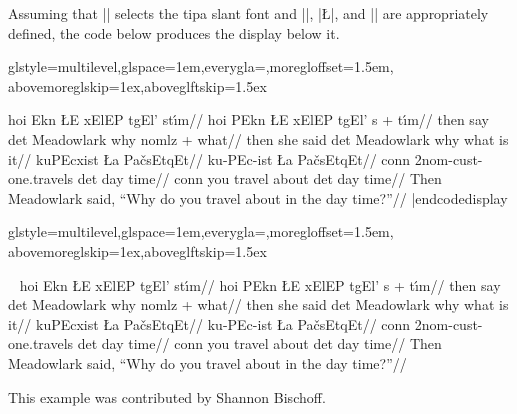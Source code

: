 Assuming that |\ips| selects the tipa slant font and |\mroot|, |\L|,
and |\W| are appropriately defined, the code below produces the
display below it.

\codedisplay
{}%
   {glstyle=multilevel,glspace=1em,everygla=\ips,moregloffset=1.5em,
   abovemoreglskip=1ex,aboveglftskip=1.5ex}

\ex[lingstyle=ips-gloss]
\begingl
\gla hoi Ekn {\L}E {x\W}ElEP t{g\W}El' st{\'\i}m//
\gla hoi {\mroot}PEkn {\L}E {x\W}ElEP t{g\W}El' {s + \mroot t\'\i m}//
\glb then {\mroot}say det Meadowlark why
   {nomlz + \mroot what}//
\glb then {she said} det Meadowlark why {what is it}//
\moregl
{} {kuPEcx\W ist} {\L a} Pa{\v c}sEtqEt//
 ku-PEc-ist {\L}a Pa{\v c}sEtqEt//
\glb conn 2nom-cust-{\mroot}one.travels det {day time}//
\glb conn {you travel about} det {day time}//
\glft Then Meadowlark said, ``Why do you travel about in the day
time?''//
\endgl
\xe
|endcodedisplay

%
   {glstyle=multilevel,glspace=1em,everygla=\ips,moregloffset=1.5em,
   abovemoreglskip=1ex,aboveglftskip=1.5ex}

\framedisplay~
\ex[lingstyle=ips-gloss]
\begingl
\gla hoi Ekn {\L}E {x\W}ElEP t{g\W}El' st{\'\i}m//
\gla hoi {\mroot}PEkn {\L}E {x\W}ElEP t{g\W}El' {s + \mroot t\'\i m}//
\glb then {\mroot}say det Meadowlark why
   {nomlz + \mroot what}//
\glb then {she said} det Meadowlark why {what is it}//
\moregl
{} {kuPEcx\W ist} {\L a} Pa{\v c}sEtqEt//
 ku-PEc-ist {\L}a Pa{\v c}sEtqEt//
\glb conn 2nom-cust-{\mroot}one.travels det {day time}//
\glb conn {you travel about} det {day time}//
\glft Then Meadowlark said, ``Why do you travel about in the day
time?''//
\endgl
\xe
\endframedisplay

\noindent This example was contributed by Shannon Bischoff.

